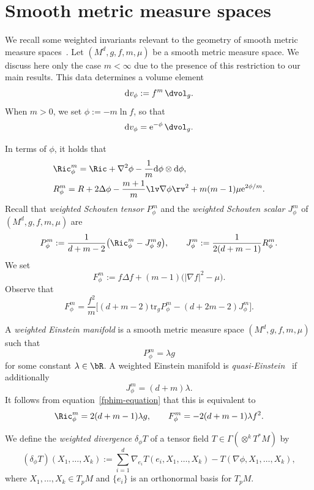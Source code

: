 \section{Smooth metric measure spaces}
\label{sec:bg.tex}

We recall some weighted invariants relevant to the geometry of smooth metric measure spaces~\cite{Case2014s}. Let $(M^d,g,f,m,\mu)$ be a smooth metric measure space. We discuss here only the case $m<\infty$ due to the presence of this restriction to our main results. This data determines a volume element
\[
{\rm d}v_\phi := f^m\,\dvol_g .
\]
When $m>0$, we set $\phi:=-m\ln f$, so that
\[
{\rm d}v_\phi = {\rm e}^{-\phi}\,\dvol_g .
\]


In terms of $\phi$, it holds that
\begin{align*}
&\Ric_\phi^m= \Ric + \nabla^2\phi - \frac{1}{m} {\rm d}\phi \otimes {\rm d}\phi,
\\
&R_\phi^m= R + 2\Delta\phi - \frac{m+1}{m}\lv\nabla\phi\rv^2 + m(m-1)\mu {\rm e}^{2\phi/m} .
\end{align*}
Recall that \emph{weighted Schouten tensor $P_\phi^m$} and the \emph{weighted Schouten scalar $J_\phi^m$} of $(M^d,g,f,m,\mu)$ are
\begin{gather*}
 P_\phi^m := \frac{1}{d+m-2}\big(\Ric_\phi^m - J_\phi^m g\big), \qquad
 J_\phi^m := \frac{1}{2(d+m-1)}R_\phi^m .
\end{gather*}
We set
\[
F_\phi^m:= f\Delta f+(m-1)\big(|\nabla f|^2-\mu\big).
\]
Observe that
\begin{equation}\label{fphim-equation}
F_\phi^m=\frac{f^2}{m}\bigl[(d+m-2)\mathrm{tr}_g P_\phi^m -(d+2m-2)J_\phi^m\bigr].
\end{equation}

A \emph{weighted Einstein manifold} is a smooth metric measure space $(M^d,g,f,m,\mu)$ such that
\[
P_\phi^m = \lambda g
\]
for some constant $\lambda\in\bR$.
A weighted Einstein manifold is \emph{quasi-Einstein}~\cite{Case_Shu_Wei} if additionally
\[
J_\phi^m=(d+m)\lambda.
\]
It follows from equation~\eqref{fphim-equation} that this is equivalent to
\[
\Ric_\phi^m=2(d+m-1)\lambda g,\qquad F_\phi^m=-2(d+m-1)\lambda f^2.
\]

We define the \emph{weighted divergence} $\delta_\phi T$ of a tensor field $T \in \Gamma(\otimes^k T^*M)$ by
\[
(\delta_\phi T)(X_1,\dots,X_k):=\sum\limits_{i=1}^d \nabla_{e_i} T(e_i,X_1,\dots,X_k)-T(\nabla\phi,X_1,\dots,X_k),
\]
where $X_1,\dots,X_k\in T_p M$ and $\{e_i\}$ is an orthonormal basis for $T_p M$.

